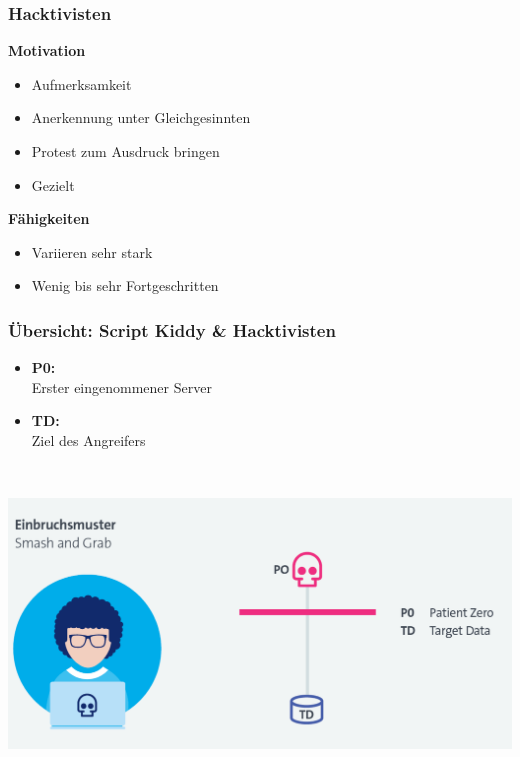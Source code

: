 \subsubsection{Hacktivisten}
\vspace{-8pt}
\begin{multicols*}{2}
    \textbf{Motivation}
    \begin{itemize}
        \item Aufmerksamkeit
        \item Anerkennung unter Gleichgesinnten
        \item Protest zum Ausdruck bringen
        \item Gezielt
    \end{itemize}
    \columnbreak
    \textbf{Fähigkeiten}
    \begin{itemize}
        \item Variieren sehr stark
        \item Wenig bis sehr Fortgeschritten
    \end{itemize}
\end{multicols*}
\vspace{-8pt}


\subsubsection{Übersicht: Script Kiddy \& Hacktivisten}
\begin{minipage}{0.3\linewidth}
    \begin{itemize}
        \item \textbf{P0:}\\ Erster eingenommener Server
        \item \textbf{TD:}\\ Ziel des Angreifers
    \end{itemize}
    \vfill
    $ $
\end{minipage}
\begin{minipage}{0.7\linewidth}
    \begin{center}
        \includegraphics[width=\linewidth]{./img/01-cyber_defense/script_hacktivist}
    \end{center}
\end{minipage}

